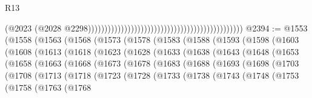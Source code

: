 \begin{lexlean}{R13}
\begin{coremodule}
                                                                                              (@2023
                                                                                                (@2028
                                                                                                  @2298)))))))))))))))))))))))))))))))))))))))))))))))
@2394 := @1553
    (@1558
      (@1563
        (@1568
          (@1573
            (@1578
              (@1583
                (@1588
                  (@1593
                    (@1598
                      (@1603
                        (@1608
                          (@1613
                            (@1618
                              (@1623
                                (@1628
                                  (@1633
                                    (@1638
                                      (@1643
                                        (@1648
                                          (@1653
                                            (@1658
                                              (@1663
                                                (@1668
                                                  (@1673
                                                    (@1678
                                                      (@1683
                                                        (@1688
                                                          (@1693
                                                            (@1698
                                                              (@1703
                                                                (@1708
                                                                  (@1713
                                                                    (@1718
                                                                      (@1723
                                                                        (@1728
                                                                          (@1733
                                                                            (@1738
                                                                              (@1743
                                                                                (@1748
                                                                                  (@1753
                                                                                    (@1758
                                                                                      (@1763
                                                                                        (@1768

\end{coremodule}
\end{lexlean}
